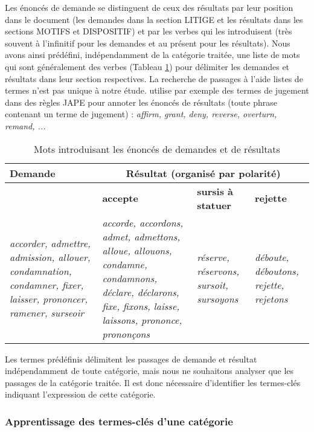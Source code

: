 Les énoncés de demande se distinguent de ceux des résultats par leur position dans le document (les demandes dans la section LITIGE et les résultats dans les sections MOTIFS et DISPOSITIF) et par les verbes qui les introduisent (très souvent à l'infinitif pour les demandes et au présent pour les résultats). Nous avons ainsi prédéfini, indépendamment de la catégorie traitée, une liste de mots qui sont généralement des verbes (Tableau \ref{tab:quanta:mots-introductifs}) pour délimiter les demandes et résultats dans leur section respectives. La recherche de passages à l'aide listes de termes n'est pas unique à notre étude. \cite{wyner2010extractlegalelts} utilise par exemple des termes de jugement dans des règles JAPE pour annoter les énoncés de résultats (toute phrase contenant un terme de jugement) : \textit{affirm, grant, deny, reverse, overturn, remand, ...}
\begin{table}
\centering
\scriptsize
 \begin{tabular}{|p{}|p{}|p{}|p{}|}
 \hline
 \textbf{Demande} & \multicolumn{3}{c|}{\textbf{Résultat} (organisé par polarité)} \\ \hline
  & \textbf{accepte}  &\textbf{sursis à statuer} & \textbf{rejette}  \\ \hline
 \textit{accorder, admettre, admission, allouer, condamnation, condamner, fixer, laisser, prononcer, ramener, surseoir} & \textit{accorde, accordons, admet, admettons, alloue, allouons, condamne, condamnons, déclare, déclarons, fixe, fixons, laisse, laissons, prononce, prononçons} & \textit{réserve, réservons, sursoit, sursoyons} & \textit{déboute, déboutons, rejette, rejetons} \\ \hline
 \end{tabular}
  \caption{Mots introduisant les énoncés de demandes et de résultats}\label{tab:quanta:mots-introductifs}
 \end{table}

Les termes prédéfinis délimitent les passages de demande et résultat indépendamment de toute catégorie, mais nous ne souhaitons analyser que les passages de la catégorie traitée. Il est donc nécessaire d'identifier les termes-clés indiquant l'expression de cette catégorie. 

\subsubsection{Apprentissage des termes-clés d'une catégorie}

